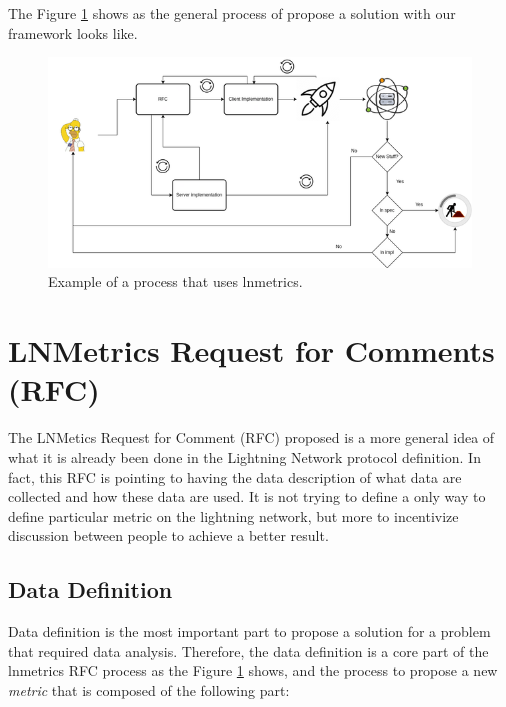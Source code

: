 The Figure \ref{fig:lnmetrics_process} shows as the general process of propose 
a solution with our framework looks like.

\begin{figure}
    \begin{center}
      \includegraphics[scale=0.7]{imgs/lnmetrics-workflow-drawio.png}
    \end{center}
    \caption{Example of a process that uses lnmetrics.}
    \label{fig:lnmetrics_process}
\end{figure}


\section{LNMetrics Request for Comments (RFC)}

The LNMetics Request for Comment (RFC) proposed is a more general idea of what 
it is already been done in the Lightning Network protocol definition. In fact,
this RFC is pointing to having the data description of what data are collected 
and how these data are used. It is not trying to define a only way to 
define particular metric on the lightning network, but more to incentivize
discussion between people to achieve a better result.

\subsection{Data Definition}

Data definition is the most important part to propose a solution for a problem 
that required data analysis. Therefore, the data definition is a core 
part of the lnmetrics RFC process as the Figure \ref{fig:lnmetrics_process}
shows, and the process to propose a new \emph{metric} that is composed of 
the following part:

